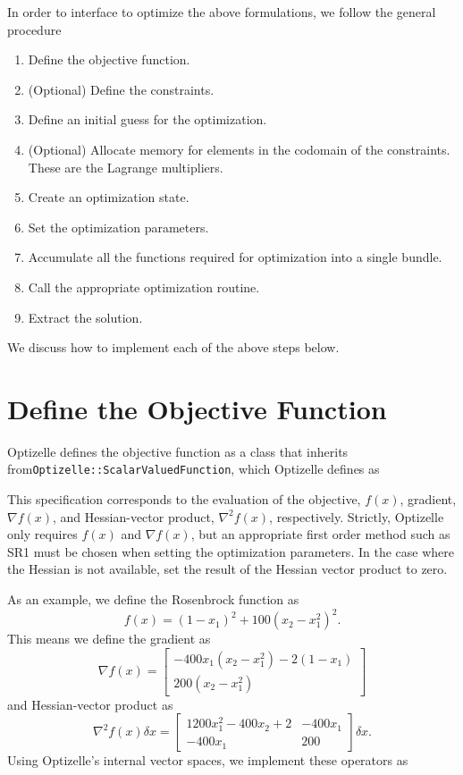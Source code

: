 \documentclass{report}
\begin{document}
        In order to interface to optimize the above formulations, we follow the general procedure
\begin{enumerate}
    \item Define the objective function.
    \item (Optional) Define the constraints.
    \item Define an initial guess for the optimization.
    \item (Optional) Allocate memory for elements in the codomain of the constraints.  These are the Lagrange multipliers. 
    \item Create an optimization state.
    \item Set the optimization parameters.
    \item Accumulate all the functions required for optimization into a single bundle.
    \item Call the appropriate optimization routine.
    \item Extract the solution.
\end{enumerate}
We discuss how to implement each of the above steps below. 

\section{Define the Objective Function}

        Optizelle defines the objective function as a class that inherits from\linebreak\texttt{Optizelle::ScalarValuedFunction}, which Optizelle defines as

This specification corresponds to the evaluation of the objective, $f(x)$, gradient, $\nabla f(x)$, and Hessian-vector product, $\nabla^2 f(x)$, respectively.  Strictly, Optizelle only requires $f(x)$ and $\nabla f(x)$, but an appropriate first order method such as SR1 must be chosen when setting the optimization parameters.  In the case where the Hessian is not available, set the result of the Hessian vector product to zero. 

        As an example, we define the Rosenbrock function as
$$
        f(x)=(1-x_1)^2+100(x_2-x_1^2)^2.
$$
This means we define the gradient as
$$
        \nabla f(x)=\begin{bmatrix}
        -400x_1(x_2-x_1^2)-2(1-x_1)\\
        200(x_2-x_1^2)
        \end{bmatrix}
$$
and Hessian-vector product as
$$
        \nabla^2 f(x)\delta x=
        \begin{bmatrix}
            1200x_1^2-400x_2+2 & -400x_1\\
            -400x_1 & 200
        \end{bmatrix}\delta x.
$$
Using Optizelle's internal vector spaces, we implement these operators as

\end{document}
